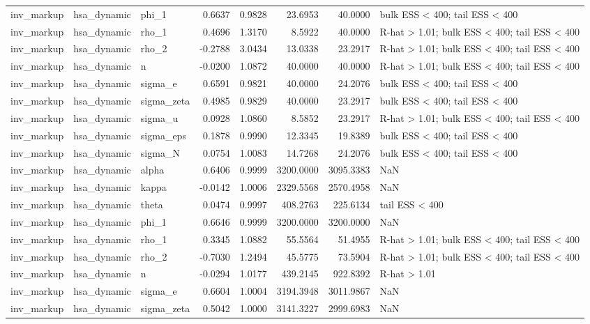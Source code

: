 \begin{tabular}{lllrrrrl}
inv\_markup & hsa\_dynamic & phi\_1 & 0.6637 & 0.9828 & 23.6953 & 40.0000 & bulk ESS < 400; tail ESS < 400 \\
inv\_markup & hsa\_dynamic & rho\_1 & 0.4696 & 1.3170 & 8.5922 & 40.0000 & R-hat > 1.01; bulk ESS < 400; tail ESS < 400 \\
inv\_markup & hsa\_dynamic & rho\_2 & -0.2788 & 3.0434 & 13.0338 & 23.2917 & R-hat > 1.01; bulk ESS < 400; tail ESS < 400 \\
inv\_markup & hsa\_dynamic & n & -0.0200 & 1.0872 & 40.0000 & 40.0000 & R-hat > 1.01; bulk ESS < 400; tail ESS < 400 \\
inv\_markup & hsa\_dynamic & sigma\_e & 0.6591 & 0.9821 & 40.0000 & 24.2076 & bulk ESS < 400; tail ESS < 400 \\
inv\_markup & hsa\_dynamic & sigma\_zeta & 0.4985 & 0.9829 & 40.0000 & 23.2917 & bulk ESS < 400; tail ESS < 400 \\
inv\_markup & hsa\_dynamic & sigma\_u & 0.0928 & 1.0860 & 8.5852 & 23.2917 & R-hat > 1.01; bulk ESS < 400; tail ESS < 400 \\
inv\_markup & hsa\_dynamic & sigma\_eps & 0.1878 & 0.9990 & 12.3345 & 19.8389 & bulk ESS < 400; tail ESS < 400 \\
inv\_markup & hsa\_dynamic & sigma\_N & 0.0754 & 1.0083 & 14.7268 & 24.2076 & bulk ESS < 400; tail ESS < 400 \\
inv\_markup & hsa\_dynamic & alpha & 0.6406 & 0.9999 & 3200.0000 & 3095.3383 & NaN \\
inv\_markup & hsa\_dynamic & kappa & -0.0142 & 1.0006 & 2329.5568 & 2570.4958 & NaN \\
inv\_markup & hsa\_dynamic & theta & 0.0474 & 0.9997 & 408.2763 & 225.6134 & tail ESS < 400 \\
inv\_markup & hsa\_dynamic & phi\_1 & 0.6646 & 0.9999 & 3200.0000 & 3200.0000 & NaN \\
inv\_markup & hsa\_dynamic & rho\_1 & 0.3345 & 1.0882 & 55.5564 & 51.4955 & R-hat > 1.01; bulk ESS < 400; tail ESS < 400 \\
inv\_markup & hsa\_dynamic & rho\_2 & -0.7030 & 1.2494 & 45.5775 & 73.5904 & R-hat > 1.01; bulk ESS < 400; tail ESS < 400 \\
inv\_markup & hsa\_dynamic & n & -0.0294 & 1.0177 & 439.2145 & 922.8392 & R-hat > 1.01 \\
inv\_markup & hsa\_dynamic & sigma\_e & 0.6604 & 1.0004 & 3194.3948 & 3011.9867 & NaN \\
inv\_markup & hsa\_dynamic & sigma\_zeta & 0.5042 & 1.0000 & 3141.3227 & 2999.6983 & NaN \\

\end{tabular}

